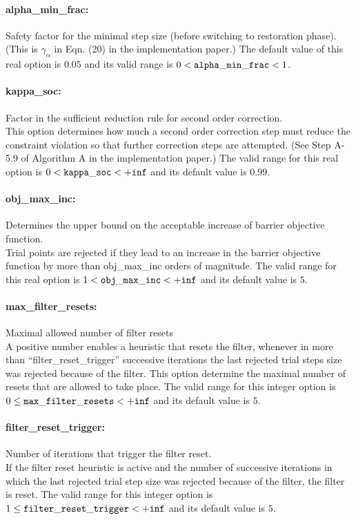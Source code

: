\paragraph{alpha\_min\_frac:} Safety factor for the minimal step size (before switching to restoration phase). $\;$ \\
 (This is $\gamma_\alpha$ in Eqn. (20) in the
implementation paper.) The default value of this real option is $0.05$ and its
valid range is $0 <  {\tt alpha\_min\_frac } <  1$.


\paragraph{kappa\_soc:} Factor in the sufficient reduction rule for second order correction. $\;$ \\
 This option determines how much a second order
correction step must reduce the constraint
violation so that further correction steps are
attempted.  (See Step A-5.9 of Algorithm A in
the implementation paper.) The valid range for this real option is 
$0 <  {\tt kappa\_soc } <  {\tt +inf}$
and its default value is $0.99$.


\paragraph{obj\_max\_inc:} Determines the upper bound on the acceptable increase of barrier objective function. $\;$ \\
 Trial points are rejected if they lead to an
increase in the barrier objective function by
more than obj\_max\_inc orders of magnitude. The valid range for this real option is 
$1 <  {\tt obj\_max\_inc } <  {\tt +inf}$
and its default value is $5$.


\paragraph{max\_filter\_resets:} Maximal allowed number of filter resets $\;$ \\
 A positive number enables a heuristic that resets
the filter, whenever in more than
``filter\_reset\_trigger'' successive iterations
the last rejected trial steps size was rejected
because of the filter.  This option determine the
maximal number of resets that are allowed to take
place. The valid range for this integer option is
$0 \le {\tt max\_filter\_resets } <  {\tt +inf}$
and its default value is $5$.


\paragraph{filter\_reset\_trigger:} Number of iterations that trigger the filter reset. $\;$ \\
 If the filter reset heuristic is active and the
number of successive iterations in which the last
rejected trial step size was rejected because of
the filter, the filter is reset. The valid range for this integer option is
$1 \le {\tt filter\_reset\_trigger } <  {\tt +inf}$
and its default value is $5$.


